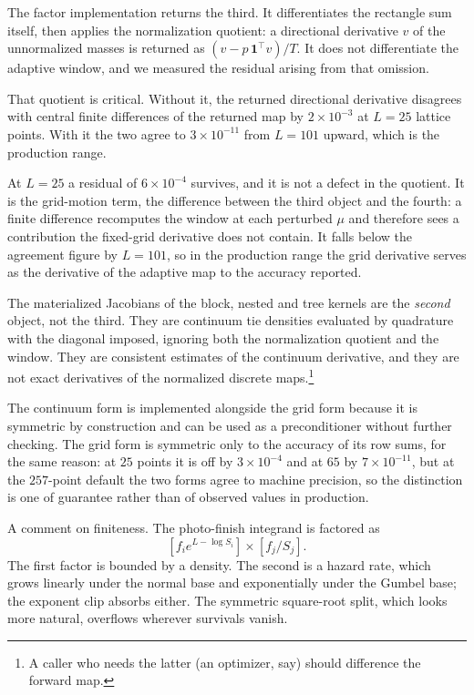 \documentclass[11pt]{article}
\begin{document}
The factor implementation returns the third. It differentiates the rectangle sum
itself, then applies the normalization quotient: a directional derivative
$v$ of the unnormalized masses is returned as
$(v-p\,\mathbf{1}^{\top}v)/T$. It does not differentiate the adaptive
window, and we measured the residual arising from that omission.

That quotient is critical. Without it, the returned directional
derivative disagrees with central finite differences of the returned map
by $2\times10^{-3}$ at $L=25$ lattice points. With it the two agree to
$3\times10^{-11}$ from $L=101$ upward, which is the production range.

At $L=25$ a residual of $6\times10^{-4}$ survives, and it is not a defect
in the quotient. It is the grid-motion term, the difference between the
third object and the fourth: a finite difference recomputes the window at
each perturbed $\mu$ and therefore sees a contribution the fixed-grid
derivative does not contain. It falls below the agreement figure by
$L=101$, so in the production range the grid derivative serves as the
derivative of the adaptive map to the accuracy reported.

The materialized Jacobians of the block, nested and tree kernels are
the \emph{second} object, not the third. They are continuum tie densities
evaluated by quadrature with the diagonal imposed, ignoring both the
normalization quotient and the window. They are consistent estimates of
the continuum derivative, and they are not exact derivatives of the
normalized discrete maps.\footnote{A caller who needs the
latter (an optimizer, say) should difference the forward map.}

The continuum form is implemented alongside the grid form because it is
symmetric by construction and can be used as a preconditioner without
further checking. The grid form is symmetric only to the accuracy of its
row sums, for the same reason: at $25$ points it is off by
$3\times10^{-4}$ and at $65$ by $7\times10^{-11}$, but at the $257$-point
default the two forms agree to machine precision, so the distinction is
one of guarantee rather than of observed values in production.

A comment on finiteness. The photo-finish integrand is
factored as $$[f_i e^{L-\log S_i}]\times[f_j/S_j].$$ The first factor is
bounded by a density. The second is a hazard rate, which grows linearly
under the normal base and exponentially under the Gumbel base; the
exponent clip absorbs either. The symmetric square-root split, which
looks more natural, overflows wherever survivals vanish.
\end{document}

